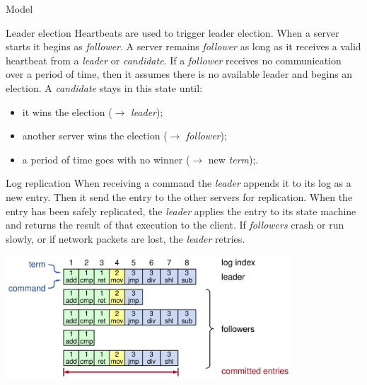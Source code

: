 \documentclass[presentation]{beamer}\mode<presentation>{\usetheme{AMSBolognaFC}}
\begin{document}
\begin{frame}[allowframebreaks]{Model}
    \framebreak
    
    \begin{block}{Leader election}
        Heartbeats are used to trigger leader election.
        When a server starts it begins as \emph{follower}.
        A server remains \emph{follower} as long as it receives a valid heartbeat from a \emph{leader} or \emph{candidate}.
        If a \emph{follower} receives no communication over a period of time, then it assumes there is no available leader and begins an election.
        A \emph{candidate} stays in this state until:
        \begin{itemize}
            \item it wins the election ($\rightarrow$ \emph{leader});
            \item another server wins the election ($\rightarrow$ \emph{follower});
            \item a period of time goes with no winner ($\rightarrow$ new \emph{term});.
        \end{itemize}   
 \end{block}
    
    \framebreak
    
    \begin{block}{Log replication}
        When receiving a command the \emph{leader} appends it to its log as a new entry.
        Then it send the entry to the other servers for replication.
        When the entry has been safely replicated, the \emph{leader} applies the entry to its state machine and returns the result of that execution to the client.
        If \emph{followers} crash or run slowly, or if network packets are lost, the \emph{leader} retries.
    \end{block}

    \framebreak

    \centering
    \includegraphics[width=0.8\textwidth]{figures/log.png}

\end{frame}
\end{document}
